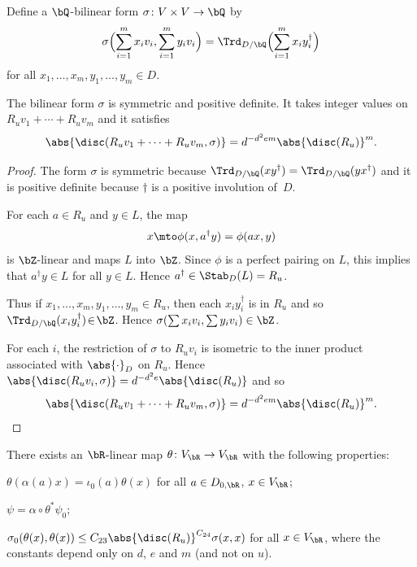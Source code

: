 Define a $\bQ$-bilinear form $\sigma \colon V \times V \to \bQ$ by
\[
\sigma \Bigl( \sum_{i=1}^m x_i v_i, \sum_{i=1}^m y_i v_i \Bigr) = \Trd_{D/\bQ} \Bigl(\sum_{i=1}^m x_i y_i^\dag\Bigr)
\]
for all $x_1, \dotsc, x_m, y_1, \dotsc, y_m \in D$.

\begin{lemma} \label{sigma-integral}
The bilinear form $\sigma$ is symmetric and positive definite.
It takes integer values on $R_uv_1 + \dotsb + R_uv_m$ and it satisfies
\[
\abs{\disc(R_uv_1 + \dotsb + R_uv_m, \sigma)} = d^{-d^2em} \abs{\disc(R_u)}^m.
\]
\end{lemma}

\begin{proof}
The form $\sigma$ is symmetric because $\Trd_{D/\bQ}(xy^\dag) = \Trd_{D/\bQ}(yx^\dag)$ and it is positive definite because $\dag$ is a positive involution of~$D$.

For each $a \in R_u$ and $y \in L$, the map
\[
x \mto \phi(x, a^\dag y) = \phi(ax, y)
\]
is $\bZ$-linear and maps $L$ into $\bZ$.
Since $\phi$ is a perfect pairing on $L$, this implies that $a^\dag y \in L$ for all $y \in L$.
Hence $a^\dag \in \Stab_D(L) = R_u$.

Thus if $x_1, \dotsc, x_m, y_1, \dotsc, y_m \!\in\! R_u$, then each $x_iy_i^\dag$ is in $R_u$ and so \hbox{$\Trd_{D/\bQ}(x_iy_i^\dag) \!\in\! \bZ$}.
Hence $\sigma(\sum x_i v_i, \sum y_i v_i) \in \bZ$.

For each $i$, the restriction of $\sigma$ to $R_uv_i$ is isometric to the inner product associated with $\abs{\cdot}_D$ on $R_u$.
Hence $\abs{\disc(R_uv_i, \sigma)} = d^{-d^2e} \abs{\disc(R_u)}$ and so
\[
\abs{\disc(R_uv_1 + \dotsb + R_uv_m, \sigma)} = d^{-d^2em} \abs{\disc(R_u)}^m.
\qedhere
\]
\end{proof}

\begin{lemma} \label{theta-def}
There exists an $\bR$-linear map $\theta \colon V_\bR \to V_\bR$ with the following properties:
\begin{enumeratei}
\item\label{theta-defi} $\theta(\alpha(a)x) = \iota_0(a)\theta(x)$ for all $a \in D_{0,\bR}$, $x \in V_\bR$;
\item\label{theta-defii} $\psi = \alpha \circ \theta^* \psi_0$;
\item\label{theta-defiii} $\sigma_0(\theta(x), \theta(x)) \leq C_{23} \abs{\disc(R_u)}^{C_{24}} \sigma(x,x)$ for all $x \in V_\bR$, where the constants depend only on $d$, $e$ and $m$ (and not on $u$).
\end{enumeratei}
\end{lemma}

